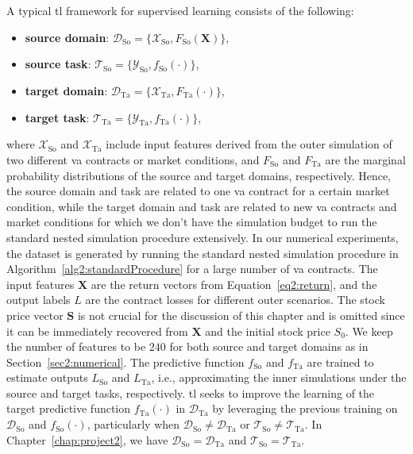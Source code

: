 A typical \gls{tl} framework for supervised learning consists of the following:
\begin{itemize}
    \item   \textbf{source domain}: $\mathcal{D}_{\text{So}} = \{\mathcal{X}_{\text{So}}, F_{\text{So}}(\mathbf{X})\}$,
    \item   \textbf{source task}: $\mathcal{T}_{\text{So}} = \{\mathcal{Y}_{\text{So}}, f_{\text{So}}(\cdot)\}$,
    \item   \textbf{target domain}: $\mathcal{D}_{\text{Ta}} = \{\mathcal{X}_{\text{Ta}}, F_{\text{Ta}}(\cdot)\}$,
    \item   \textbf{target task}: $\mathcal{T}_{\text{Ta}} = \{\mathcal{Y}_{\text{Ta}}, f_{\text{Ta}}(\cdot)\}$,
\end{itemize}
where $\mathcal{X}_{\text{So}}$ and $\mathcal{X}_{\text{Ta}}$ include input features derived from the outer simulation of two different \gls{va} contracts or market conditions, and $F_{\text{So}}$ and $F_{\text{Ta}}$ are the marginal probability distributions of the source and target domains, respectively.
Hence, the source domain and task are related to one \gls{va} contract for a certain market condition, while the target domain and task are related to new \gls{va} contracts and market conditions for which we don't have the simulation budget to run the standard nested simulation procedure extensively.
In our numerical experiments, the dataset is generated by running the standard nested simulation procedure in Algorithm~\ref{alg2:standardProcedure} for a large number of \gls{va} contracts.
The input features $\mathbf{X}$ are the return vectors from Equation~\eqref{eq2:return}, and the output labels $L$ are the contract losses for different outer scenarios.
The stock price vector $\mathbf{S}$ is not crucial for the discussion of this chapter and is omitted since it can be immediately recovered from $\mathbf{X}$ and the initial stock price $S_0$.
We keep the number of features to be $\num{240}$ for both source and target domains as in Section~\ref{sec2:numerical}.
The predictive function $f_{\text{So}}$ and $f_{\text{Ta}}$ are trained to estimate outputs $L_{\text{So}}$ and $L_{\text{Ta}}$, i.e., approximating the inner simulations under the source and target tasks, respectively.
\gls{tl} seeks to improve the learning of the target predictive function $f_{\text{Ta}}(\cdot)$ in $\mathcal{D}_{\text{Ta}}$ by leveraging the previous training on $\mathcal{D}_{\text{So}}$ and $f_{\text{So}}(\cdot)$, particularly when $\mathcal{D}_{\text{So}} \neq \mathcal{D}_{\text{Ta}}$ or $\mathcal{T}_{\text{So}} \neq \mathcal{T}_{\text{Ta}}$.
In Chapter~\ref{chap:project2}, we have $\mathcal{D}_{\text{So}} = \mathcal{D}_{\text{Ta}}$ and $\mathcal{T}_{\text{So}} = \mathcal{T}_{\text{Ta}}$.

